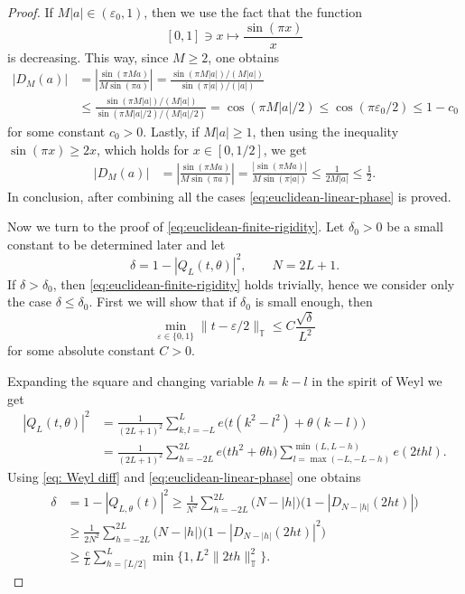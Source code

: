 \documentclass[10pt,a4paper]{amsart}
\newcommand{\T}{\mathbb T}
\begin{document}
\begin{proof}
If $M|a| \in (\varepsilon_0, 1)$, then we use the fact that the function 
\[
 [0,1] \ni x \mapsto \frac{\sin(\pi x)}{x}
\]
is decreasing. This way, since $M \ge 2$, one obtains
\begin{align*}
    \left|D_M(a)\right|&= \left| \frac{\sin(\pi Ma)}{M \sin(\pi a)}  \right|= \frac{\sin(\pi M|a|)/(M|a|)}{ \sin(\pi|a|)/(|a|)} 
    \\
    &\le \frac{\sin(\pi M|a|)/(M|a|)}{ \sin(\pi M |a|/2)/(M|a|/2)}  = \cos(\pi M|a|/2) \le \cos(\pi\varepsilon_0/2) \le 1-c_0
\end{align*}
for some constant $c_0>0$. Lastly, if $M|a| \ge 1$, then using the inequality $\sin (\pi x) \ge 2x$, which holds for $x \in [0, 1/2]$, we get
\begin{align*}
    \left|D_M(a)\right|&= \left| \frac{\sin(\pi Ma)}{M \sin(\pi a)}  \right|= \frac{|\sin(\pi Ma)|}{ M\sin(\pi|a|)} \le  \frac{1}{2M |a|} \le \frac{1}{2}.
\end{align*}
In conclusion, after combining all the cases \eqref{eq:euclidean-linear-phase} is proved.
\par
Now we turn to the proof of \eqref{eq:euclidean-finite-rigidity}.
Let $\delta_0>0$ be a small constant to be determined later and let
\begin{equation*}
    \delta= 1- \left|Q_{L}(t, \theta) \right|^2, \qquad N=2L+1.
\end{equation*}
If $\delta>\delta_0$, then \eqref{eq:euclidean-finite-rigidity} holds trivially, hence we consider only the case $\delta \le \delta_0$.
First we will show that if $\delta_0$ is small enough, then 
\begin{equation} \label{eq: bound on t}
    \min_{\varepsilon \in \{0,1\}}\|t-\varepsilon/2 \|_{\T} \le C \frac{\sqrt{\delta}}{L^2}
\end{equation}
for some absolute constant $C>0$.

Expanding the square and changing variable $h=k-l$ in the spirit of Weyl we get 
\begin{equation} 
\label{eq: Weyl diff}
\begin{split}
    |Q_{L}(t, \theta)|^2&= \frac{1}{(2L+1)^2} \sum_{k,l=-L}^L e\big(t(k^2-l^2)+\theta(k-l) \big) \\
    & =\frac{1}{(2L+1)^2} \sum_{h=-2L}^{2L} e\big( th^2+\theta h\big) \sum_{l=\max(-L,-L-h)}^{\min(L,L-h)}e(2t hl).
\end{split}
\end{equation}
Using \eqref{eq: Weyl diff} and \eqref{eq:euclidean-linear-phase} one obtains
\begin{align*}
    \delta&=1-|Q_{L,\theta}(t)|^2 \ge  \frac{1}{N^2} \sum_{h=-2L}^{2L} \Big(N-|h| \Big) \Big(1- \left|D_{N-|h|}(2 ht) \right|\Big) \\
    &\ge \frac{1}{2N^2} \sum_{h=-2L}^{2L} \Big(N-|h| \Big) \Big(1- \left|D_{N-|h|}(2 ht) \right|^2\Big) \\
    &\ge  \frac{c}{L} \sum_{h=\lceil L/2 \rceil}^L  \min\{1, L^2 \|2t h \|_{\T}^2 \}.
\end{align*}


\end{proof}
\end{document}
